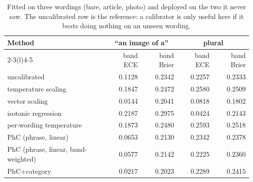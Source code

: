 \begin{table}[t]
\caption{Fitted on three wordings (bare, article, photo) and deployed on the two it never saw. The uncalibrated row is the reference: a calibrator is only useful here if it beats doing nothing on an unseen wording.}
\label{tab:heldout}
\begin{tabular*}{\textwidth}{@{\extracolsep{\fill}}lrrrr@{}}
\toprule
Method & \multicolumn{2}{c}{``an image of a''} & \multicolumn{2}{c}{plural} \\
\cmidrule(lr){2-3}\cmidrule(l){4-5}
 & band ECE & band Brier & band ECE & band Brier \\
\midrule
uncalibrated                       & 0.1128 & 0.2342 & 0.2257 & 0.2333 \\
temperature scaling                & 0.1847 & 0.2472 & 0.2580 & 0.2509 \\
vector scaling                     & 0.0144 & 0.2041 & 0.0818 & 0.1802 \\
isotonic regression                & 0.2187 & 0.2975 & 0.0424 & 0.2143 \\
per-wording temperature            & 0.1873 & 0.2480 & 0.2593 & 0.2518 \\
PhC (phrase, linear)               & 0.0653 & 0.2130 & 0.2342 & 0.2378 \\
PhC (phrase, linear, band-weighted) & 0.0577 & 0.2142 & 0.2225 & 0.2360 \\
PhC+category                       & 0.0217 & 0.2023 & 0.2289 & 0.2415 \\
\bottomrule
\end{tabular*}
\end{table}
